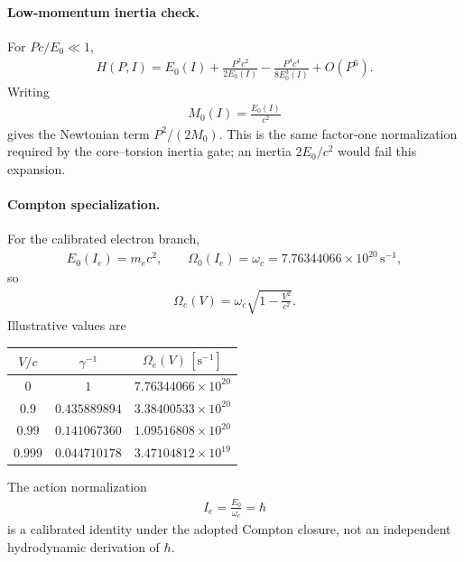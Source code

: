 \paragraph{Low-momentum inertia check.}
For \(Pc/E_0\ll1\),
\begin{align}
    H(P,I)
    =
    E_0(I)
    +
    \frac{P^2c^2}{2E_0(I)}
    -
    \frac{P^4c^4}{8E_0^3(I)}
    +
    O(P^6).
    \label{eq:rt_action_phase_low_p_expansion}
\end{align}
Writing
\begin{align}
    M_0(I)=\frac{E_0(I)}{c^2}
\end{align}
gives the Newtonian term \(P^2/(2M_0)\).  This is the same factor-one
normalization required by the core--torsion inertia gate; an inertia
\(2E_0/c^2\) would fail this expansion.

\paragraph{Compton specialization.}
For the calibrated electron branch,
\begin{align}
    E_0(I_e)=m_ec^2,
    \qquad
    \Omega_0(I_e)=\omega_c
    =7.76344066\times10^{20}\,\mathrm{s^{-1}},
\end{align}
so
\begin{align}
    \Omega_e(V)
    =
    \omega_c\sqrt{1-\frac{V^2}{c^2}}.
    \label{eq:rt_action_phase_compton_frequency}
\end{align}
Illustrative values are
\begin{center}
\begin{tabular}{ccc}
\hline
\(V/c\) & \(\gamma^{-1}\) & \(\Omega_e(V)\,[\mathrm{s^{-1}}]\) \\
\hline
\(0\) & \(1\) & \(7.76344066\times10^{20}\) \\
\(0.9\) & \(0.435889894\) & \(3.38400533\times10^{20}\) \\
\(0.99\) & \(0.141067360\) & \(1.09516808\times10^{20}\) \\
\(0.999\) & \(0.044710178\) & \(3.47104812\times10^{19}\) \\
\hline
\end{tabular}
\end{center}
The action normalization
\begin{align}
    I_e
    =
    \frac{E_0}{\omega_c}
    =
    \hbar
    \label{eq:rt_action_phase_ie_hbar}
\end{align}
is a calibrated identity under the adopted Compton closure, not an independent
hydrodynamic derivation of \(\hbar\).

